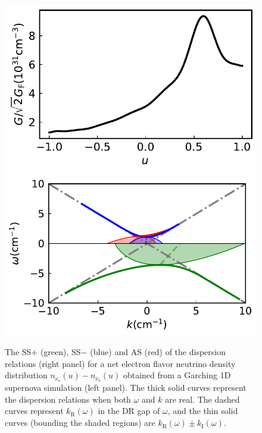 \begin{figure}
     \includegraphics[width=\linewidth]{chapters/assets/dr/spectGarchingPlt.pdf}
   \endminipage\hfill
   \includegraphics[width=\linewidth]{chapters/assets/dr/spectGarchingDRLSAPltBlob.pdf}
   \endminipage\hfill
   \caption{The SS$+$ (green), SS$-$ (blue) and AS (red) of the dispersion relations (right panel) for a net electron flavor neutrino density distribution $n_{\nu_{\ee}}(u) -n_{\bar\nu_\ee}(u)$ obtained from a Garching 1D supernova simulation (left panel). The thick solid curves represent the dispersion relations when both $\omega$ and $k$ are real. The dashed curves represent $k_{\mathrm R}(\omega)$ in the DR gap of $\omega$, and the thin solid curves (bounding the shaded regions) are $k_{\mathrm R}(\omega)\pm k_{\mathrm I}(\omega)$.}
   \label{fig-garching}
\end{figure}









